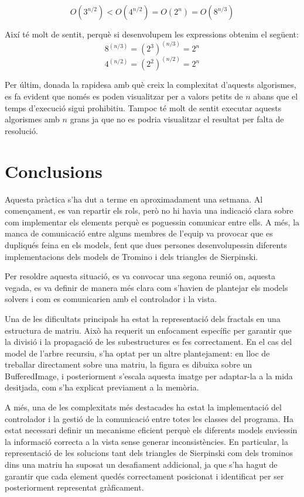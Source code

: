 \documentclass{ieeetj}
\begin{document}
\[
\boxed{O(3^{n/2}) < O(4^{n/2}) = O(2^n) = O(8^{n/3})}
\]



Així té molt de sentit, perquè si desenvolupem les expressions obtenim el següent:  
\[\boxed{
8^{(n/3)} = (2^3)^{(n/3)} = 2^n}
\]  
\[\boxed{
4^{(n/2)} = (2^2)^{(n/2)} = 2^n
}\]


Per últim, donada la rapidesa amb què creix la complexitat d'aquests algorismes, es fa evident que només es poden visualitzar per a valors petits de \( n \) abans que el temps d'execució sigui prohibitiu.
Tampoc té molt de sentit executar aquests algorismes amb \(n \) grans ja que no es podria visualitzar el resultat per falta de resolució.

\section{Conclusions}  
Aquesta pràctica s’ha dut a terme en aproximadament una setmana. Al començament, es van repartir els rols, però no hi havia una indicació clara sobre com implementar els elements perquè es poguessin comunicar entre ells. A més, la manca de comunicació entre alguns membres de l’equip va provocar que es dupliqués feina en els models, fent que dues persones desenvolupessin diferents implementacions dels models de Tromino i dels triangles de Sierpinski.

Per resoldre aquesta situació, es va convocar una segona reunió on, aquesta vegada, es va definir de manera més clara com s’havien de plantejar els models solvers i com es comunicarien amb el controlador i la vista.

Una de les dificultats principals ha estat la representació dels fractals en una estructura de matriu. Això ha requerit un enfocament específic per garantir que la divisió i la propagació de les subestructures es fes correctament. En el cas del model de l'arbre recursiu, s'ha optat per un altre plantejament: en lloc de treballar directament sobre una matriu, la figura es dibuixa sobre un BufferedImage, i posteriorment s'escala aquesta imatge per adaptar-la a la mida desitjada, com s'ha explicat previament a la memòria.

A més, una de les complexitats més destacades ha estat la implementació del controlador i la gestió de la comunicació entre totes les classes del programa. Ha estat necessari definir un mecanisme eficient perquè els diferents models enviessin la informació correcta a la vista sense generar inconsistències. En particular, la representació de les solucions tant dels triangles de Sierpinski com dels trominos dins una matriu ha suposat un desafiament addicional, ja que s’ha hagut de garantir que cada element quedés correctament posicionat i identificat per ser posteriorment representat gràficament.
\end{document}
